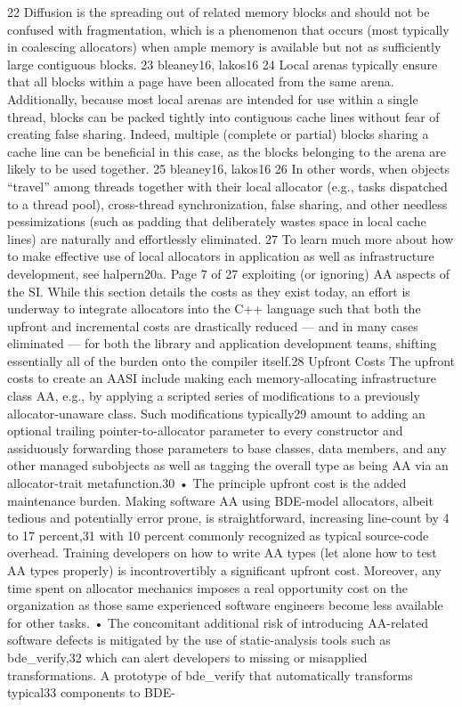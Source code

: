 22 Diffusion is the spreading out of related memory blocks and should not be confused with
fragmentation, which is a phenomenon that occurs (most typically in coalescing allocators) when
ample memory is available but not as sufficiently large contiguous blocks.
23 bleaney16, lakos16
24 Local arenas typically ensure that all blocks within a page have been allocated from the same
arena. Additionally, because most local arenas are intended for use within a single thread, blocks can
be packed tightly into contiguous cache lines without fear of creating false sharing. Indeed, multiple
(complete or partial) blocks sharing a cache line can be beneficial in this case, as the blocks
belonging to the arena are likely to be used together.
25 bleaney16, lakos16
26 In other words, when objects “travel” among threads together with their local allocator (e.g.,
tasks dispatched to a thread pool), cross-thread synchronization, false sharing, and other needless
pessimizations (such as padding that deliberately wastes space in local cache lines) are naturally and
effortlessly eliminated. 27 To learn much more about how to make effective use of local allocators in application as well as
infrastructure development, see halpern20a.
Page 7 of 27
exploiting (or ignoring) AA aspects of the SI. While this section details the costs as
they exist today, an effort is underway to integrate allocators into the C++ language
such that both the upfront and incremental costs are drastically reduced — and in
many cases eliminated — for both the library and application development teams,
shifting essentially all of the burden onto the compiler itself.28
Upfront Costs
The upfront costs to create an AASI include making each memory-allocating
infrastructure class AA, e.g., by applying a scripted series of modifications to a
previously allocator-unaware class. Such modifications typically29 amount to adding
an optional trailing pointer-to-allocator parameter to every constructor and
assiduously forwarding those parameters to base classes, data members, and any
other managed subobjects as well as tagging the overall type as being AA via an
allocator-trait metafunction.30
• The principle upfront cost is the added maintenance burden. Making software
AA using BDE-model allocators, albeit tedious and potentially error prone, is
straightforward, increasing line-count by 4 to 17 percent,31 with 10 percent
commonly recognized as typical source-code overhead. Training developers on
how to write AA types (let alone how to test AA types properly) is
incontrovertibly a significant upfront cost. Moreover, any time spent on
allocator mechanics imposes a real opportunity cost on the organization as
those same experienced software engineers become less available for other
tasks.
• The concomitant additional risk of introducing AA-related software defects is
mitigated by the use of static-analysis tools such as bde_verify,32 which can
alert developers to missing or misapplied transformations. A prototype of
bde_verify that automatically transforms typical33 components to BDE-

